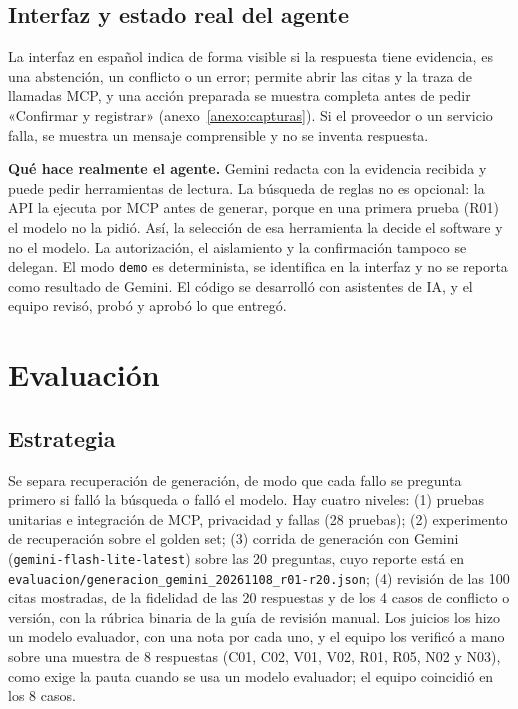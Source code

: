 \documentclass[11pt,a4paper]{article}
\newcommand{\codigo}[1]{\texttt{\small #1}}
\begin{document}
\subsection{Interfaz y estado real del agente}
La interfaz en español indica de forma visible si la respuesta tiene evidencia, es una abstención, un conflicto o un error; permite abrir las citas y la traza de llamadas MCP, y una acción preparada se muestra completa antes de pedir «Confirmar y registrar» (anexo~\ref{anexo:capturas}). Si el proveedor o un servicio falla, se muestra un mensaje comprensible y no se inventa respuesta.

\textbf{Qué hace realmente el agente.} Gemini redacta con la evidencia recibida y puede pedir herramientas de lectura. La búsqueda de reglas no es opcional: la API la ejecuta por MCP antes de generar, porque en una primera prueba (R01) el modelo no la pidió. Así, la selección de esa herramienta la decide el software y no el modelo. La autorización, el aislamiento y la confirmación tampoco se delegan. El modo \codigo{demo} es determinista, se identifica en la interfaz y no se reporta como resultado de Gemini. El código se desarrolló con asistentes de IA, y el equipo revisó, probó y aprobó lo que entregó.

\section{Evaluación}
\subsection{Estrategia}
Se separa recuperación de generación, de modo que cada fallo se pregunta primero si falló la búsqueda o falló el modelo. Hay cuatro niveles: (1) pruebas unitarias e integración de MCP, privacidad y fallas (28 pruebas); (2) experimento de recuperación sobre el golden set; (3) corrida de generación con Gemini (\codigo{gemini-flash-lite-latest}) sobre las 20 preguntas, cuyo reporte está en \codigo{evaluacion/generacion\_gemini\_20261108\_r01-r20.json}; (4) revisión de las 100 citas mostradas, de la fidelidad de las 20 respuestas y de los 4 casos de conflicto o versión, con la rúbrica binaria de la guía de revisión manual. Los juicios los hizo un modelo evaluador, con una nota por cada uno, y el equipo los verificó a mano sobre una muestra de 8 respuestas (C01, C02, V01, V02, R01, R05, N02 y N03), como exige la pauta cuando se usa un modelo evaluador; el equipo coincidió en los 8 casos.
\end{document}
